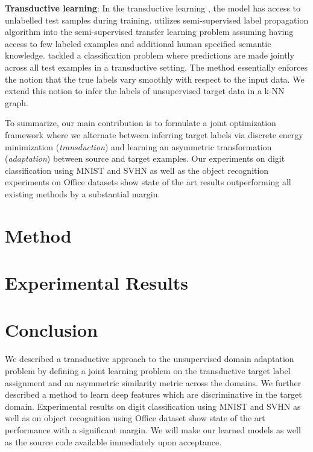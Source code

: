 \documentclass{article}
\begin{document}
\textbf{Transductive learning}: In the transductive learning \cite{transduction}, the model has access to unlabelled test samples during training.  \cite{marcus} utilizes semi-supervised label propagation algorithm into the semi-supervised transfer learning problem assuming having access to few labeled examples and additional human specified semantic knowledge. \cite{coclassification} tackled a classification problem where predictions are made jointly across all test examples in a transductive \cite{transduction} setting. The method essentially enforces the notion that the true labels vary smoothly with respect to the input data. We extend this notion to infer the labels of unsupervised target data in a k-NN graph. 

To summarize, our main contribution is to formulate a joint optimization framework where we alternate between inferring target labels via discrete energy minimization (\textit{transduction}) and learning an asymmetric transformation (\textit{adaptation}) between source and target examples. Our experiments on digit classification using MNIST \cite{mnist} and SVHN\cite{svhn} as well as the object recognition experiments on Office \cite{office} datasets show state of the art results outperforming all existing methods by a substantial margin.


\section{Method} 




\section{Experimental Results}

\section{Conclusion} 
We described a transductive approach to the unsupervised domain adaptation problem by defining a joint learning problem on the transductive target label assignment and an asymmetric similarity metric across the domains. We further described a method to learn deep features which are discriminative in the target domain. Experimental results on digit classification using MNIST\cite{mnist} and SVHN\cite{svhn} as well as on object recognition using Office\cite{office} dataset show state of the art performance with a significant margin. We will make our learned models as well as the source code available immediately upon acceptance.



\clearpage
\setlength{\bibsep}{2.5pt plus 0.25ex}
{\small


}
\end{document}
